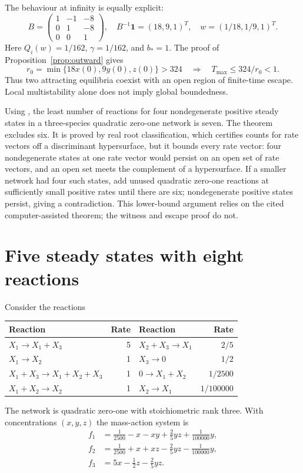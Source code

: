 \documentclass[11pt]{article}
\theoremstyle{remark}\newtheorem{remark}[theorem]{Remark}
\newcommand{\one}{\mathbf 1}
\begin{document}
The behaviour at infinity is equally explicit:
\[
 B=\begin{pmatrix}1&-1&-8\\0&1&-8\\0&0&1\end{pmatrix},\quad
 B^{-1}\one=(18,9,1)^T,\quad w=(1/18,1/9,1)^T.
\]
Here $Q_i(w)=1/162$, $\gamma=1/162$, and $b_*=1$. The proof of
Proposition~\ref{prop:outward} gives
\begin{equation}\label{eq:escape}
 r_0=\min\{18x(0),9y(0),z(0)\}>324
 \quad\Longrightarrow\quad T_{\max}\le324/r_0<1.
\end{equation}
Thus two attracting equilibria coexist with an open region of finite-time
escape. Local multistability alone does not imply global boundedness.

Using \cite[Theorem 2]{TZ}, the least number of reactions for four nondegenerate
positive steady states in a three-species quadratic zero-one network is seven. The theorem excludes six. It is proved by real
root classification, which certifies counts for rate vectors off a discriminant
hypersurface, but it bounds every rate vector: four nondegenerate states at one
rate vector would persist on an open set of rate vectors, and an open set meets
the complement of a hypersurface. If a smaller network
had four such states, add unused quadratic zero-one reactions at sufficiently
small positive rates until there are six; nondegenerate positive states persist,
giving a contradiction. This lower-bound argument relies on the cited
computer-assisted theorem; the witness and escape proof do not.

\section{Five steady states with eight reactions}\label{sec:five}
Consider the reactions
\begin{center}
\begin{tabular}{lr@{\qquad}lr}
\toprule
Reaction & Rate & Reaction & Rate\\\midrule
$X_1\to X_1+X_3$ & 5 & $X_2+X_3\to X_1$ & $2/5$\\
$X_1\to X_2$ & 1 & $X_3\to0$ & $1/2$\\
$X_1+X_3\to X_1+X_2+X_3$ & 1 & $0\to X_1+X_2$ & $1/2500$\\
$X_1+X_2\to X_2$ & 1 & $X_2\to X_1$ & $1/100000$\\\bottomrule
\end{tabular}
\end{center}
The network is quadratic zero-one with stoichiometric rank three. With
concentrations $(x,y,z)$ the mass-action system is
\begin{equation}\label{eq:eight}
\begin{aligned}
 f_1&=\tfrac1{2500}-x-xy+\tfrac25yz+\tfrac1{100000}y,\\
 f_2&=\tfrac1{2500}+x+xz-\tfrac25yz-\tfrac1{100000}y,\\
 f_3&=5x-\tfrac12z-\tfrac25yz.
\end{aligned}
\end{equation}
\end{document}
